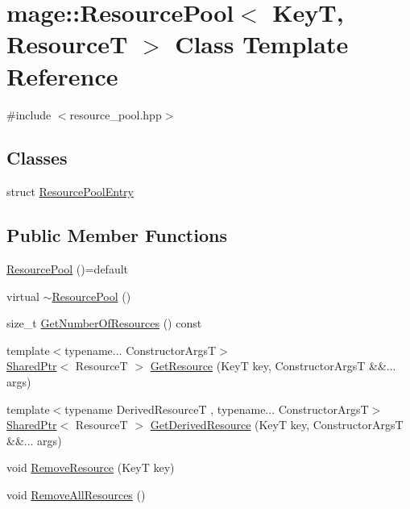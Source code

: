 \hypertarget{classmage_1_1_resource_pool}{}\section{mage\+:\+:Resource\+Pool$<$ KeyT, ResourceT $>$ Class Template Reference}
\label{classmage_1_1_resource_pool}


{\ttfamily \#include $<$resource\+\_\+pool.\+hpp$>$}

\subsection*{Classes}
\begin{DoxyCompactItemize}
\item 
struct \hyperlink{structmage_1_1_resource_pool_1_1_resource_pool_entry}{Resource\+Pool\+Entry}
\end{DoxyCompactItemize}
\subsection*{Public Member Functions}
\begin{DoxyCompactItemize}
\item 
\hyperlink{classmage_1_1_resource_pool_a94aff142869744ed48fb1b426face48b}{Resource\+Pool} ()=default
\item 
virtual \hyperlink{classmage_1_1_resource_pool_ae4fff3d951818d417f77965c2db265f6}{$\sim$\+Resource\+Pool} ()
\item 
size\+\_\+t \hyperlink{classmage_1_1_resource_pool_ae2f9964a1821c9b8cb38303a5a88c98e}{Get\+Number\+Of\+Resources} () const
\item 
{\footnotesize template$<$typename... Constructor\+ArgsT$>$ }\\\hyperlink{namespacemage_a1e01ae66713838a7a67d30e44c67703e}{Shared\+Ptr}$<$ ResourceT $>$ \hyperlink{classmage_1_1_resource_pool_add76506394983fe84bc2cb95cfd5f7e2}{Get\+Resource} (KeyT key, Constructor\+ArgsT \&\&... args)
\item 
{\footnotesize template$<$typename Derived\+ResourceT , typename... Constructor\+ArgsT$>$ }\\\hyperlink{namespacemage_a1e01ae66713838a7a67d30e44c67703e}{Shared\+Ptr}$<$ ResourceT $>$ \hyperlink{classmage_1_1_resource_pool_a2c1116cecf0a88953fa681f254de8680}{Get\+Derived\+Resource} (KeyT key, Constructor\+ArgsT \&\&... args)
\item 
void \hyperlink{classmage_1_1_resource_pool_acda87b2a5cc6ea3880f40df0ac6fb4d9}{Remove\+Resource} (KeyT key)
\item 
void \hyperlink{classmage_1_1_resource_pool_a83a33e15bd8f326d0ebc11b3f8e52a41}{Remove\+All\+Resources} ()
\end{DoxyCompactItemize}
